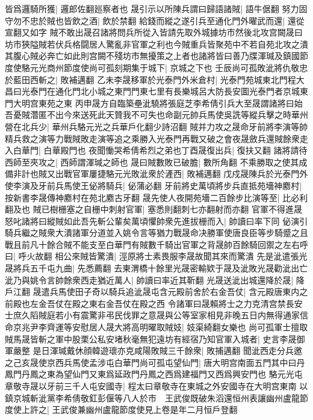 皆爲邏騎所獲|{
	邏郎佐翻廵察者也}
晟引示以所陳兵謂曰歸語諸賊|{
	語牛倨翻}
努力固守勿不忠於賊也皆飲之酒|{
	飲於禁翻}
給錢而縱之遂引兵至通化門外曜武而還|{
	還從宣翻又如字}
賊不敢出晟召諸將問兵所從入皆請先取外城據坊市然後北攻宫闕晟曰坊市狹隘賊若伏兵格闘居人驚亂非官軍之利也今賊重兵皆聚苑中不若自苑北攻之潰其腹心賊必奔亡如此則宫闕不殘坊市無擾策之上者也諸將皆曰善乃牒渾瑊及鎮國節度使駱元光商州節度使尚可孤刻期集于城下|{
	京城之下也}
壬辰尚可孤敗泚將仇敬忠於藍田西斬之|{
	敗補邁翻}
乙未李晟移軍於光泰門外米倉村|{
	光泰門苑城東北門程大昌曰光泰門在通化門北小城之東門門東七里有長樂城呂大防長安圖光泰門者京城東門大明宫東苑之東}
丙申晟方自臨築壘泚驍將張庭芝李希倩引兵大至晟謂諸將曰始吾憂賊濳匿不出今來送死此天贊我不可失也命副元帥兵馬使吳詵等縱兵擊之時華州營在北兵少|{
	華州兵駱元光之兵華戶化翻少詩沼翻}
賊并力攻之晟命牙前將李演等帥精兵救之演等力戰賊敗走演等追之乘勝入光泰門再戰又破之會夜晟斂兵還賊餘衆走入白華門|{
	白華殿門也}
夜聞慟哭希倩希烈之弟也丁酉晟復出兵|{
	復扶又翻}
諸將請待西師至夾攻之|{
	西師謂渾瑊之師也}
晟曰賊數敗已破膽|{
	數所角翻}
不乘勝取之使其成備非計也賊又出戰官軍屢捷駱元光敗泚衆於滻西|{
	敗補邁翻}
戊戍晟陳兵於光泰門外使李演及牙前兵馬使王佖將騎兵|{
	佖蒲必翻}
牙前將史萬頃將步兵直抵苑墻神䴥村|{
	按新書李晟傳神䴥村在苑北䴥古牙翻}
晟先使人夜開苑墻二百餘步比演等至|{
	比必利翻及也}
賊已樹栅塞之自栅中刺射官軍|{
	塞悉則翻刺七亦翻射而亦翻}
官軍不得進晟怒叱諸將曰縱賊如此吾先斬公輩矣萬頃懼帥衆先進拔栅而入|{
	帥讀曰率下同}
佖演引騎兵繼之賊衆大潰諸軍分道並入姚令言等猶力戰晟命决勝軍使唐良臣等步騎蹙之且戰且前凡十餘合賊不能支至白華門有賊數千騎出官軍之背晟帥百餘騎回禦之左右呼曰|{
	呼火故翻}
相公來賊皆驚潰|{
	涇原將士素畏服李晟故聞其來而驚潰}
先是泚遣張光晟將兵五千屯九曲|{
	先悉薦翻}
去東渭橋十餘里光晟密輸欵于晟及泚敗光晟勸泚出亡泚乃與姚令言帥餘衆西走猶近萬人|{
	帥讀曰率近其靳翻}
光晟送泚出城還降於晟|{
	降戶江翻}
晟遣兵馬使田子奇以騎兵追泚晟屯含元殿前舍於右金吾仗|{
	含元殿唐東内之前殿也左金吾仗在殿之東右金吾仗在殿之西}
令諸軍曰晟賴將士之力克清宫禁長安士庶久䧟賊庭若小有震驚非弔民伐罪之意晟與公等室家相見非晚五日内無得通家信命京兆尹李齊運等安慰居人晟大將高明曜取賊妓|{
	妓渠綺翻女樂也}
尚可孤軍士擅取賊馬晟皆斬之軍中股栗公私安堵秋毫無犯遠坊有經宿乃知官軍入城者|{
	史言李晟御軍嚴整}
是日渾瑊戴休顔韓遊瓌亦克咸陽敗賊三千餘衆|{
	敗捕邁翻}
聞泚西走分兵邀之己亥晟使京西兵馬使孟涉屯白華門尚可孤屯望仙門|{
	唐大明宫南面五門其中曰丹鳳門丹鳳之東為望仙門又東爲延政門丹鳳之西爲建福門又西爲興安門也}
駱元光屯章敬寺晟以牙前三千人屯安國寺|{
	程太曰章敬寺在東城之外安國寺在大明宫東南}
以鎮京城斬泚黨李希倩敬釭彭偃等八人於市　王武俊既破朱滔還恒州表讓幽州盧龍節度使上許之|{
	王武俊兼幽州盧龍節度使見上卷是年二月恒戶登翻}

